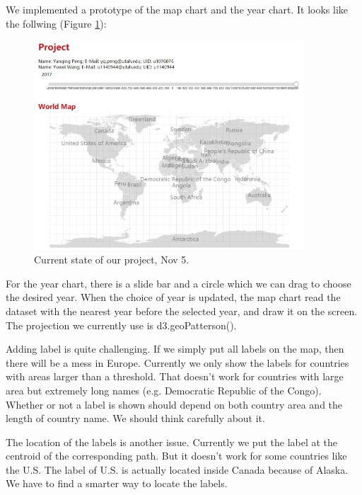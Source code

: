 \documentclass[12pt, fullpage,letterpaper]{article}
\begin{document}
We implemented a prototype of the map chart and the year chart.
It looks like the follwing (Figure \ref{fig:nov5}):

\begin{figure}[h!]
    \begin{center}
        \includegraphics[width=0.9\textwidth]{figs/Nov5.jpg}
        \caption{Current state of our project, Nov 5.}
        \label{fig:nov5}
    \end{center}
\end{figure}

For the year chart, there is a slide bar and a circle which we can drag to choose the desired year.
When the choice of year is updated, the map chart read the dataset with the nearest year before the selected year,
and draw it on the screen. The projection we currently use is d3.geoPatterson().

Adding label is quite challenging. If we simply put all labels on the map,
then there will be a mess in Europe. Currently we only show the labels for countries
with areas larger than a threshold. That doesn't work for countries with large area but extremely
long names (e.g. Democratic Republic of the Congo). Whether or not a label is shown
should depend on both country area and the length of country name. We should think carefully about it.

The location of the labels is another issue. Currently we put the label
at the centroid of the corresponding path. But it doesn't work for some countries like the U.S.
The label of U.S. is actually located inside Canada because of Alaska.
We have to find a smarter way to locate the labels.

\newpage
\end{document}
